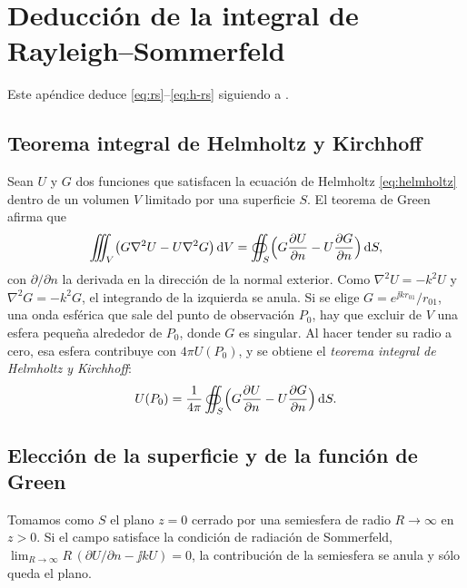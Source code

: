 \chapter{Deducción de la integral de Rayleigh--Sommerfeld}\label{ap:rs}

Este apéndice deduce \eqref{eq:rs}--\eqref{eq:h-rs} siguiendo a
\textcite[secs.~3.3--3.5]{goodman2005}.

\section{Teorema integral de Helmholtz y Kirchhoff}

Sean $U$ y $G$ dos funciones que satisfacen la ecuación de Helmholtz \eqref{eq:helmholtz}
dentro de un volumen $V$ limitado por una superficie $S$. El teorema de Green afirma que
\begin{equation}
  \iiint_V\bigl(G\nabla^2U-U\nabla^2G\bigr)\,\mathrm{d} V
  =\oiint_S\Bigl(G\frac{\partial U}{\partial n}-U\frac{\partial G}{\partial n}\Bigr)\,\mathrm{d} S,
  \label{eq:green}
\end{equation}
con $\partial/\partial n$ la derivada en la dirección de la normal exterior. Como
$\nabla^2U=-k^2U$ y $\nabla^2G=-k^2G$, el integrando de la izquierda se anula. Si se elige
$G=e^{\jj kr_{01}}/r_{01}$, una onda esférica que sale del punto de observación $P_0$, hay que
excluir de $V$ una esfera pequeña alrededor de $P_0$, donde $G$ es singular. Al hacer tender su
radio a cero, esa esfera contribuye con $4\pi U(P_0)$, y se obtiene el \emph{teorema integral de
Helmholtz y Kirchhoff}:
\begin{equation}
  U(P_0)=\frac{1}{4\pi}\oiint_S\Bigl(G\frac{\partial U}{\partial n}-U\frac{\partial G}{\partial n}\Bigr)\,\mathrm{d} S .
  \label{eq:hk}
\end{equation}

\section{Elección de la superficie y de la función de Green}

Tomamos como $S$ el plano $z=0$ cerrado por una semiesfera de radio $R\to\infty$ en $z>0$. Si el
campo satisface la condición de radiación de Sommerfeld,
$\lim_{R\to\infty}R\,(\partial U/\partial n-\jj kU)=0$, la contribución de la semiesfera se anula
y sólo queda el plano.

